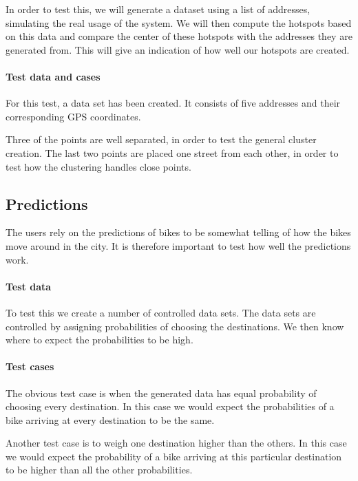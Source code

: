 In order to test this, we will generate a dataset using a list of addresses, simulating the real usage of the system.
We will then compute the hotspots based on this data and compare the center of these hotspots with the addresses they are generated from.
This will give an indication of how well our hotspots are created.

\paragraph{Test data and cases}
For this test, a data set has been created.
It consists of five addresses and their corresponding GPS coordinates.

Three of the points are well separated, in order to test the general cluster creation.
The last two points are placed one street from each other, in order to test how the clustering handles close points.

\subsection{Predictions}
The users rely on the predictions of bikes to be somewhat telling of how the bikes move around in the city.
It is therefore important to test how well the predictions work.

\paragraph{Test data} To test this we create a number of controlled data sets.
The data sets are controlled by assigning probabilities of choosing the destinations. 
We then know where to expect the probabilities to be high.

\paragraph{Test cases}
The obvious test case is when the generated data has equal probability of choosing every destination. 
In this case we would expect the probabilities of a bike arriving at every destination to be the same.

Another test case is to weigh one destination higher than the others.
In this case we would expect the probability of a bike arriving at this particular destination to be higher than all the other probabilities.